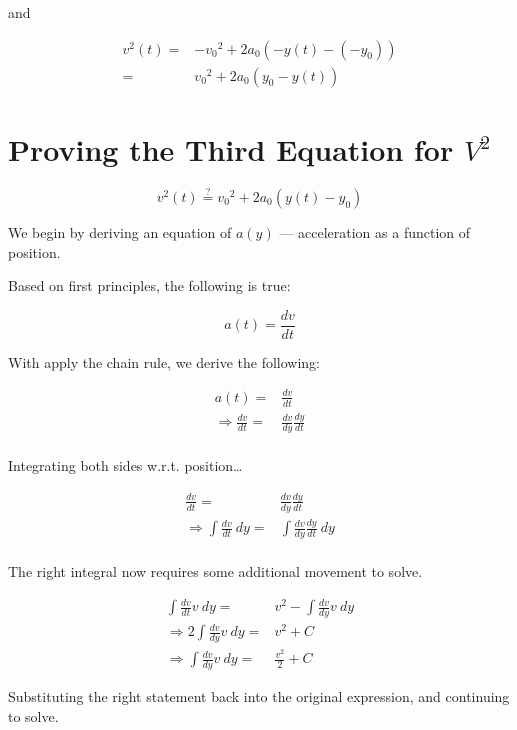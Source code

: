 \documentclass[letterpaper]{article}
\begin{document}
and

\begin{align}
    v^2(t) =& {-v_0}^2 + 2a_0 (-y(t) - (-y_0)) \\
    =& {v_0}^2 + 2a_0 (y_0 - y(t)) 
\end{align}


\section{Proving the Third Equation for \(V^2\)}
\label{sec:org8c49008}
\begin{equation}
    v^2(t) \stackrel{?}{=} {v_0}^2 + 2a_0(y(t)-y_0)
\end{equation}

We begin by deriving an equation of \(a(y)\) --- acceleration as a function of position.

Based on first principles, the following is true:

\begin{equation}
    a(t) = \frac{dv}{dt}
\end{equation}

With apply the chain rule, we derive the following:

\begin{align}
    a(t) =& \frac{dv}{dt} \\
    \Rightarrow \frac{dv}{dt} =& \frac{dv}{dy}\frac{dy}{dt} \\
\end{align}

Integrating both sides w.r.t. position\ldots{}

\begin{align}
    \frac{dv}{dt} =& \frac{dv}{dy}\frac{dy}{dt} \\
    \Rightarrow \int \frac{dv}{dt}\ dy =& \int \frac{dv}{dy}\frac{dy}{dt}\ dy\\
\end{align}

The right integral now requires some additional movement to solve.

\begin{align}
     \int \frac{dv}{dt}v\ dy =& v^2 - \int \frac{dv}{dy} v\ dy \\
     \Rightarrow 2\int \frac{dv}{dy}v\ dy =& v^2 + C \\
     \Rightarrow \int \frac{dv}{dy}v\ dy =& \frac{v^2}{2} + C
\end{align}

Substituting the right statement back into the original expression, and continuing to solve.
\end{document}
